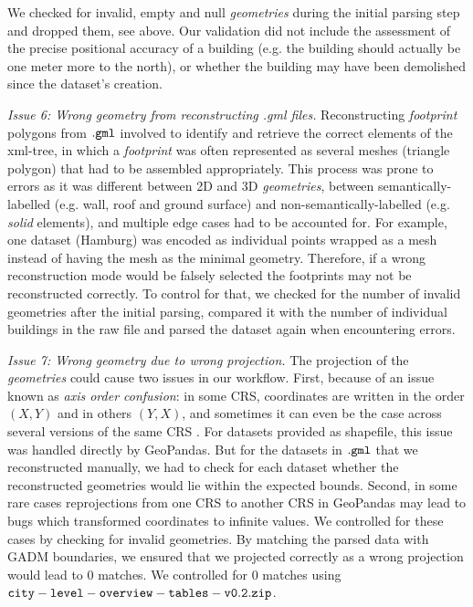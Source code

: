 \documentclass[fleqn,10pt]{wlscirep}
\begin{document}
We checked for invalid, empty and null \textit{geometries} during the initial parsing step and dropped them, see above. Our validation did not include the assessment of the precise positional accuracy of a building (e.g. the building should actually be one meter more to the north), or whether the building may have been demolished since the dataset's creation.

\medskip \noindent \textit{Issue 6: Wrong geometry from reconstructing .gml files.} \hspace{0.1cm} Reconstructing \textit{footprint} polygons from $\tt{.gml}$ involved to identify and retrieve the correct elements of the xml-tree, in which a \textit{footprint} was often represented as several meshes (triangle polygon) that had to be assembled appropriately. This process was prone to errors as it was different between 2D and 3D \textit{geometries}, between semantically-labelled (e.g. wall, roof and ground surface) and non-semantically-labelled (e.g. \textit{solid} elements), and multiple edge cases had to be accounted for. For example, one dataset (Hamburg) was encoded as individual points wrapped as a mesh instead of having the mesh as the minimal geometry. Therefore, if a wrong reconstruction mode would be falsely selected the footprints may not be reconstructed correctly. To control for that, we checked for the number of invalid geometries after the initial parsing, compared it with the number of individual buildings in the raw file and parsed the dataset again when encountering errors.       

\medskip \noindent \textit{Issue 7: Wrong geometry due to wrong projection.} \hspace{0.1cm} The projection of the \textit{geometries} could cause two issues in our workflow. First, because of an issue known as \textit{axis order confusion}: in some CRS, coordinates are written in the order $(X,Y)$ and in others $(Y,X)$, and sometimes it can even be the case across several versions of the same CRS \cite{reed2017}. For datasets provided as shapefile, this issue was handled directly by GeoPandas. But for the datasets in $\tt{.gml}$ that we reconstructed manually, we had to check for each dataset whether the reconstructed geometries would lie within the expected bounds. Second, in some rare cases reprojections from one CRS to another CRS in GeoPandas may lead to bugs which transformed coordinates to infinite values. We controlled for these cases by checking for invalid geometries. By matching the parsed data with GADM boundaries, we ensured that we projected correctly as a wrong projection would lead to 0 matches. We controlled for 0 matches using ${\tt city-level-overview-tables-v0.2.zip}$. 
\end{document}
